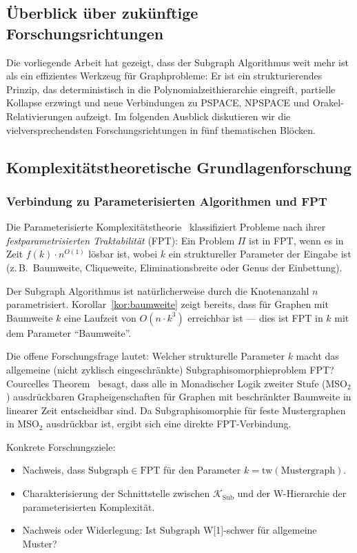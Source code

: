 ﻿\documentclass[a4paper,12pt]{article}
\theoremstyle{definition}
\begin{document}
\subsection{Überblick über zukünftige Forschungsrichtungen}

Die vorliegende Arbeit hat gezeigt, dass der Subgraph Algorithmus weit mehr ist
als ein effizientes Werkzeug für Graphprobleme: Er ist ein strukturierendes Prinzip,
das deterministisch in die Polynomialzeithierarchie eingreift, partielle Kollapse
erzwingt und neue Verbindungen zu PSPACE, NPSPACE und Orakel-Relativierungen aufzeigt.
Im folgenden Ausblick diskutieren wir die vielversprechendsten Forschungsrichtungen
in fünf thematischen Blöcken.

\subsection{Komplexitätstheoretische Grundlagenforschung}

\subsubsection{Verbindung zu Parameterisierten Algorithmen und FPT}

Die Parameterisierte Komplexitätstheorie~\cite{downey1999parameterized} klassifiziert
Probleme nach ihrer \emph{festparametrisierten Traktabilität} (FPT):
Ein Problem $\Pi$ ist in FPT, wenn es in Zeit $f(k) \cdot n^{O(1)}$ lösbar ist,
wobei $k$ ein struktureller Parameter der Eingabe ist (z.\,B.\ Baumweite, Cliqueweite,
Eliminationsbreite oder Genus der Einbettung).

Der Subgraph Algorithmus ist natürlicherweise durch die Knotenanzahl $n$ parametrisiert.
Korollar~\ref{kor:baumweite} zeigt bereits, dass für Graphen mit Baumweite $k$
eine Laufzeit von $O(n \cdot k^3)$ erreichbar ist --- dies ist FPT in $k$ mit
dem Parameter ``Baumweite''.

Die offene Forschungsfrage lautet: Welcher strukturelle Parameter $k$ macht das
allgemeine (nicht zyklisch eingeschränkte) Subgraphisomorphieproblem FPT?
Courcelles Theorem~\cite{courcelle1990monadic} besagt, dass alle in Monadischer
Logik zweiter Stufe (MSO$_2$) ausdrückbaren Grapheigenschaften für Graphen
mit beschränkter Baumweite in linearer Zeit entscheidbar sind.
Da Subgraphisomorphie für feste Mustergraphen in MSO$_2$ ausdrückbar ist,
ergibt sich eine direkte FPT-Verbindung.

Konkrete Forschungsziele:
\begin{itemize}
  \item Nachweis, dass $\mathrm{Subgraph} \in \mathrm{FPT}$ für den Parameter
        $k = \mathrm{tw}(\text{Mustergraph})$.
  \item Charakterisierung der Schnittstelle zwischen
        $\mathcal{K}_\mathrm{Sub}$ und der W-Hierarchie der parameterisierten Komplexität.
  \item Nachweis oder Widerlegung: Ist $\mathrm{Subgraph}$ W[1]-schwer
        für allgemeine Muster?
\end{itemize}
\end{document}
